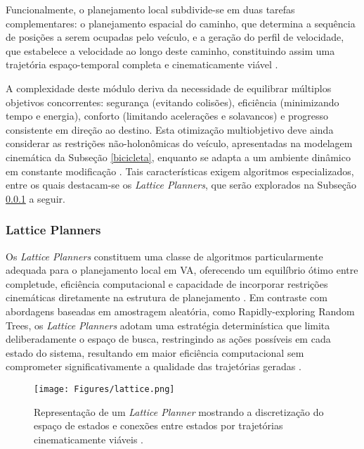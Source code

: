 Funcionalmente, o planejamento local subdivide-se em duas tarefas complementares: o planejamento espacial do caminho, que determina a sequência de posições a serem ocupadas pelo veículo, e a geração do perfil de velocidade, que estabelece a velocidade ao longo deste caminho, constituindo assim uma trajetória espaço-temporal completa e cinematicamente viável \cite{University_of_Toronto2018-mp}.

A complexidade deste módulo deriva da necessidade de equilibrar múltiplos objetivos concorrentes: segurança (evitando colisões), eficiência (minimizando tempo e energia), conforto (limitando acelerações e solavancos) e progresso consistente em direção ao destino. Esta otimização multiobjetivo deve ainda considerar as restrições não-holonômicas do veículo, apresentadas na modelagem cinemática da Subseção \ref{bicicleta}, enquanto se adapta a um ambiente dinâmico em constante modificação \cite{University_of_Toronto2018-mp}. Tais características exigem algoritmos especializados, entre os quais destacam-se os \textit{Lattice Planners}, que serão explorados na Subseção \ref{lattice_planners} a seguir.

\subsubsection{Lattice Planners} \label{lattice_planners}

Os \textit{Lattice Planners} constituem uma classe de algoritmos particularmente adequada para o planejamento local em VA, oferecendo um equilíbrio ótimo entre completude, eficiência computacional e capacidade de incorporar restrições cinemáticas diretamente na estrutura de planejamento \cite{pivtoraiko2009differentially}. Em contraste com abordagens baseadas em amostragem aleatória, como Rapidly-exploring Random Trees, os \textit{Lattice Planners} adotam uma estratégia determinística que limita deliberadamente o espaço de busca, restringindo as ações possíveis em cada estado do sistema, resultando em maior eficiência computacional sem comprometer significativamente a qualidade das trajetórias geradas \cite{University_of_Toronto2018-mp}.

\begin{figure}[H]
\centering
\texttt{[image: Figures/lattice.png]}
\caption{Representação de um \textit{Lattice Planner} mostrando a discretização do espaço de estados e conexões entre estados por trajetórias cinematicamente viáveis \cite[Module 2 - Lesson 4: Hierarchical Motion Planning. ~15min30s]{University_of_Toronto2018-mp}.}
\label{lattice}
\end{figure}

